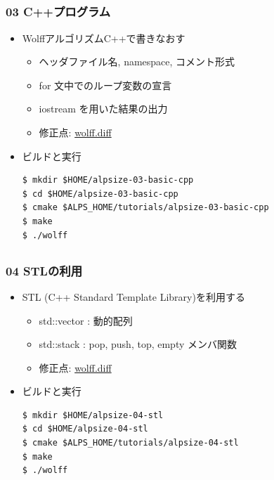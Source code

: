 \subsection*{\redm\whitem\greenb}
\begin{frame}[fragile]
  \frametitle{03 C++プログラム}
  \begin{itemize}
    \item WolffアルゴリズムC++で書きなおす
      \begin{itemize}
        \item ヘッダファイル名, namespace, コメント形式
        \item for 文中でのループ変数の宣言
        \item iostream を用いた結果の出力
        \item 修正点: \href{https://github.com/cmsi/alps-tutorial/blob/develop/alpsize/03-wolff.diff}{wolff.diff}
      \end{itemize}
    \item ビルドと実行
\begin{lstlisting}
$ mkdir $HOME/alpsize-03-basic-cpp
$ cd $HOME/alpsize-03-basic-cpp
$ cmake $ALPS_HOME/tutorials/alpsize-03-basic-cpp
$ make
$ ./wolff
\end{lstlisting}
  \end{itemize}
\end{frame}

\subsection*{\redm\whitem\greenb}
\begin{frame}[fragile]
  \frametitle{04 STLの利用}
  \begin{itemize}
    \item STL (C++ Standard Template Library)を利用する
      \begin{itemize}
        \item std::vector : 動的配列
        \item std::stack : pop, push, top, empty メンバ関数
        \item 修正点: \href{https://github.com/cmsi/alps-tutorial/blob/develop/alpsize/04-wolff.diff}{wolff.diff}
      \end{itemize}
    \item ビルドと実行
\begin{lstlisting}
$ mkdir $HOME/alpsize-04-stl
$ cd $HOME/alpsize-04-stl
$ cmake $ALPS_HOME/tutorials/alpsize-04-stl
$ make
$ ./wolff
\end{lstlisting}
  \end{itemize}
\end{frame}

